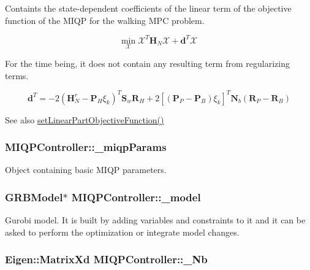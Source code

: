 \-Containts the state-\/dependent coefficients of the linear term of the objective function of the \-M\-I\-Q\-P for the walking \-M\-P\-C problem.

\[ \underset{\mathcal{X}}{\text{min}} \; \mathcal{X}^T \mathbf{H}_N \mathcal{X} + \mathbf{d}^T \mathcal{X} \]

\-For the time being, it does not contain any resulting term from regularizing terms.

\[ \mathbf{d}^T = -2(\mathbf{H}_N^r - \mathbf{P}_H \xi_k)^T \mathbf{S}_w \mathbf{R}_H + 2[(\mathbf{P}_P - \mathbf{P}_B) \xi_k]^T \mathbf{N}_b(\mathbf{R}_P - \mathbf{R}_B) \]

\begin{DoxySeeAlso}{\-See also}
\hyperlink{classMIQPController_a2d882a4cd9e9832d8b9b2ad73111be0f}{set\-Linear\-Part\-Objective\-Function()} 
\end{DoxySeeAlso}
\hypertarget{classMIQPController_a23f6caec48541df0ebe3f91189171ce5}{
\subsubsection[{\-\_\-miqp\-Params}]{ {\bf \-M\-I\-Q\-P\-Controller\-::\-\_\-miqp\-Params}}}\label{classMIQPController_a23f6caec48541df0ebe3f91189171ce5}
\-Object containing basic \-M\-I\-Q\-P parameters. \hypertarget{classMIQPController_a2bafe24633a7f8c9d6211cde12b29a90}{
\subsubsection[{\-\_\-model}]{\setlength{\rightskip}{0pt plus 5cm}\-G\-R\-B\-Model$\ast$ {\bf \-M\-I\-Q\-P\-Controller\-::\-\_\-model}}}\label{classMIQPController_a2bafe24633a7f8c9d6211cde12b29a90}
\-Gurobi model. \-It is built by adding variables and constraints to it and it can be asked to perform the optimization or integrate model changes. \hypertarget{classMIQPController_aaed002a2578a0f83c4ee59516a793f98}{
\subsubsection[{\-\_\-\-Nb}]{\setlength{\rightskip}{0pt plus 5cm}\-Eigen\-::\-Matrix\-Xd {\bf \-M\-I\-Q\-P\-Controller\-::\-\_\-\-Nb}}}\label{classMIQPController_aaed002a2578a0f83c4ee59516a793f98}
